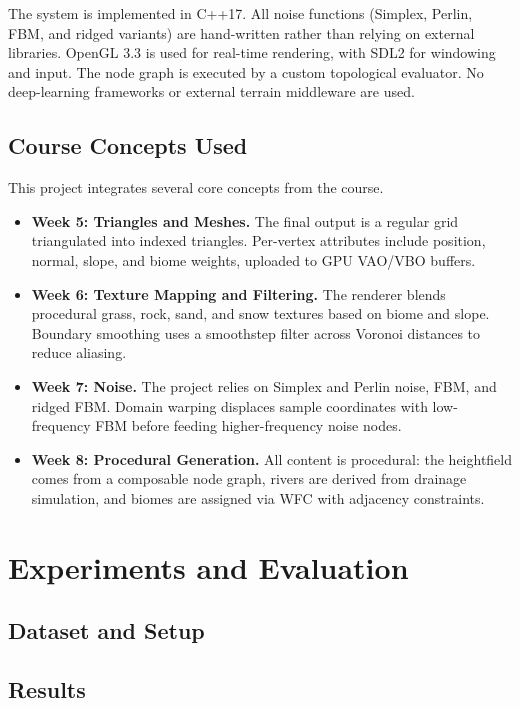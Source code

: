 \documentclass[12pt]{article}
\begin{document}
The system is implemented in C++17. All noise functions (Simplex, Perlin, FBM, and ridged variants) are hand-written rather than relying on external libraries. OpenGL 3.3 is used for real-time rendering, with SDL2 for windowing and input. The node graph is executed by a custom topological evaluator. No deep-learning frameworks or external terrain middleware are used.

\subsection{Course Concepts Used}

This project integrates several core concepts from the course.

\begin{itemize}
    \item \textbf{Week 5: Triangles and Meshes.} The final output is a regular grid triangulated into indexed triangles. Per-vertex attributes include position, normal, slope, and biome weights, uploaded to GPU VAO/VBO buffers.
    \item \textbf{Week 6: Texture Mapping and Filtering.} The renderer blends procedural grass, rock, sand, and snow textures based on biome and slope. Boundary smoothing uses a smoothstep filter across Voronoi distances to reduce aliasing.
    \item \textbf{Week 7: Noise.} The project relies on Simplex and Perlin noise, FBM, and ridged FBM. Domain warping displaces sample coordinates with low-frequency FBM before feeding higher-frequency noise nodes.
    \item \textbf{Week 8: Procedural Generation.} All content is procedural: the heightfield comes from a composable node graph, rivers are derived from drainage simulation, and biomes are assigned via WFC with adjacency constraints.
\end{itemize}


\section{Experiments and Evaluation}

\subsection{Dataset and Setup}

\subsection{Results}
\end{document}
